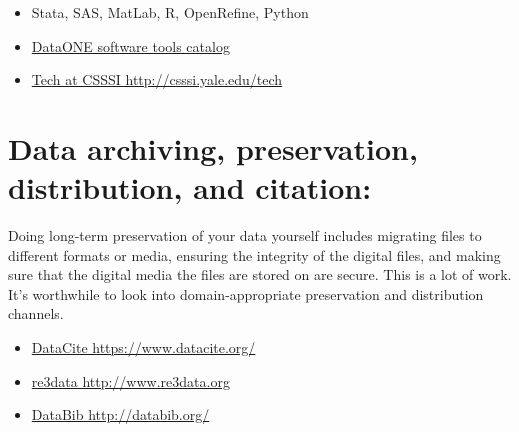 \documentclass{tufte-handout}
\begin{document}
\begin{itemize}
\itemsep1pt\parskip0pt
\item
  Stata, SAS, MatLab, R, OpenRefine, Python
\item
  \href{http://www.dataone.org/software_tools_catalog}{DataONE software tools catalog}
  \item
  \href{http://csssi.yale.edu/tech}{Tech at CSSSI http://csssi.yale.edu/tech}
\end{itemize}





\section{Data archiving, preservation, distribution, and citation:}\label{data-archiving-preservation} 
Doing long-term preservation of your data yourself includes migrating files to different formats or media, ensuring the integrity of the digital files, and making sure that the digital media the files are stored on are secure. This is a lot of work. It's worthwhile to look into domain-appropriate preservation and distribution channels.
\begin{itemize}
\itemsep1pt\parskip0pt
\item
  \href{https://www.datacite.org/}{DataCite https://www.datacite.org/}
\item
 \href{http://www.re3data.org}{re3data http://www.re3data.org}
\item
\href{http://databib.org/}{DataBib http://databib.org/}
\end{itemize}

\end{document}
